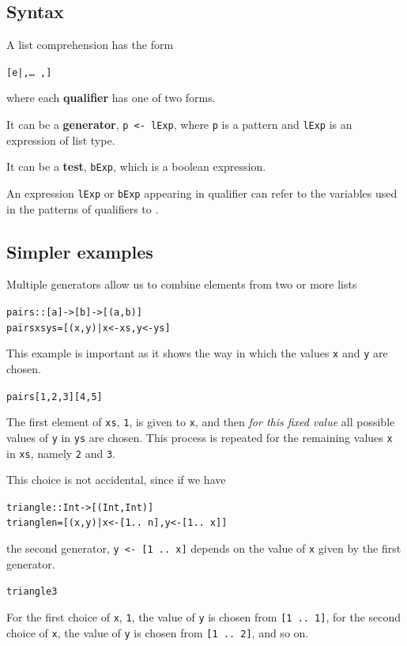 \subsection*{Syntax}

A list comprehension has the form
\begin{alltt}
[ e |  , \ldots\ ,  ]
\end{alltt}
where each \textbf{qualifier} \texttt{} has one of two forms.
\begin{titemize}
\item It can be a \textbf{generator}, 
\texttt{p <- lExp},
where \texttt{p} %
is a pattern and \texttt{lExp} is an
expression of list type.
\item It can be a \textbf{test}, \texttt{bExp}, 
which is a boolean expression.
\end{titemize}
An expression \texttt{lExp} or \texttt{bExp} appearing in qualifier 
\texttt{} can refer to the
variables used in the patterns of qualifiers \texttt{} to 
\texttt{}.

\subsection*{Simpler examples}

Multiple generators 
allow us to combine elements from two or more lists
\begin{alltt}
pairs :: [a] -> [b] -> [(a,b)]
pairs xs ys = [ (x,y) | x<-xs , y<-ys ]
\end{alltt}
This example is important as it shows the way in which the values \texttt{x} and
\texttt{y} are chosen.
\begin{alltt}
pairs [1,2,3] [4,5] 
\step [(1,4),(1,5),(2,4),(2,5),(3,4),(3,5)]
\end{alltt}
The first element of \texttt{xs}, \texttt{1}, is given to \texttt{x}, and then {\em for
this fixed value\/} all possible values of \texttt{y} in \texttt{ys} are chosen. This
process is repeated for the remaining values \texttt{x} in \texttt{xs}, namely 
\texttt{2} and \texttt{3}. 

This choice is not accidental, since if we have
\begin{alltt}
triangle :: Int -> [(Int,Int)]
triangle n = [ (x,y) | x <- [1 ..\ n] , y <- [1 ..\ x] ]
\end{alltt}
the second generator, \texttt{y <- [1 ..\ x]} depends on the value of \texttt{x} given
by the first generator.
\begin{alltt}
triangle 3 
\step [(1,1),(2,1),(2,2),(3,1),(3,2),(3,3)]
\end{alltt}
For the first choice of \texttt{x}, \texttt{1}, the value of \texttt{y} is 
chosen from \texttt{[1 ..\ 1]},
for the second choice of \texttt{x}, the value of \texttt{y} is chosen from 
\texttt{[1 ..\ 2]}, and so on.

